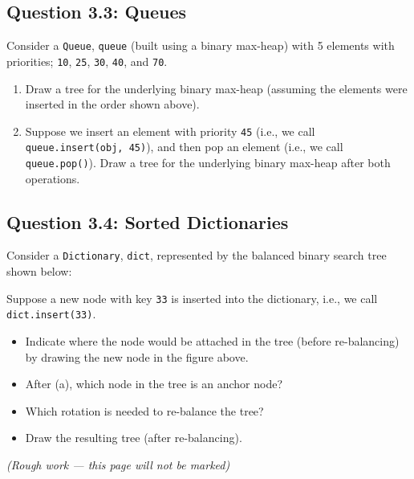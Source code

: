 \documentclass[12pt]{article}
\begin{document}
\subsection*{Question 3.3: Queues}
\points[4] Consider a \texttt{Queue}, \texttt{queue} (built using a binary max-heap) with 5 elements with priorities; \texttt{10}, \texttt{25}, \texttt{30}, \texttt{40}, and \texttt{70}.
\begin{enumerate}
\item[(a)]\points[2] Draw a tree for the underlying binary max-heap (assuming the elements were inserted in the order shown above).
\vspace{6cm}
\item[(b)] \points[2] Suppose we insert an element with priority \texttt{45} (i.e., we call \texttt{queue.insert(obj, 45)}), and then pop an element (i.e., we call \texttt{queue.pop()}). Draw a tree for the underlying binary max-heap after both operations.
\end{enumerate}

\clearpage

\subsection*{Question 3.4: Sorted Dictionaries}
\points[4] Consider a \texttt{Dictionary}, \texttt{dict}, represented by the balanced binary search tree shown below:
\begin{center}
\end{center}

Suppose a new node with key \texttt{33} is inserted into the dictionary, i.e., we call \texttt{dict.insert(33)}.
\begin{itemize}
\item[(a)]\points[1] Indicate where the node would be attached in the tree (before re-balancing) by drawing the new node in the figure above.
\item[(b)]\points[1] After (a), which node in the tree is an anchor node?
\numbox[2cm] \checkbox[None]
\item[(c)]\points[1] Which rotation is needed to re-balance the tree? \\[2mm]
\checkbox[Left] \checkbox[Right]   \checkbox[None]
\item[(d)] \points[1] Draw the resulting tree (after re-balancing).
\end{itemize}

\clearpage

\begin{center}
\textit{(Rough work — this page will not be marked)}
\end{center}
\clearpage
\end{document}
